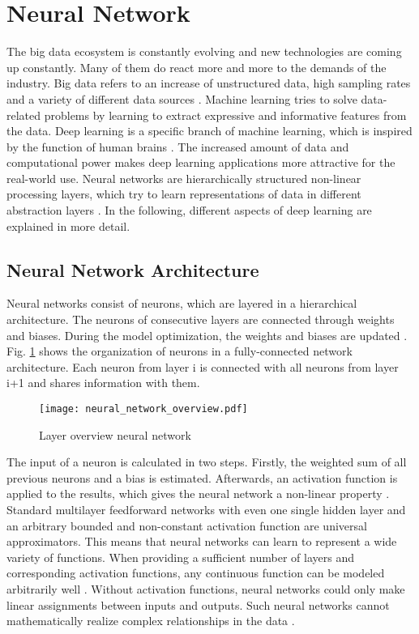\section{Neural Network}
The big data ecosystem is constantly evolving and new technologies are coming up constantly. Many of them do react more and more to the demands of the industry. Big data refers to an increase of unstructured data, high sampling rates and a variety of different data sources \cite{Sagiroglu2013}. Machine learning tries to solve data-related problems by learning to extract expressive and informative features from the data. Deep learning is a specific branch of machine learning, which is inspired by the function of human brains \cite{Calin2020}. The increased amount of data and computational power makes deep learning applications more attractive for the real-world use. Neural networks are hierarchically structured non-linear processing layers, which try to learn representations of data in different abstraction layers \cite{ZHAO2019213}. In the following, different aspects of deep learning are explained in more detail.

\subsection{Neural Network Architecture}
Neural networks consist of neurons, which are layered in a hierarchical architecture. The neurons of consecutive layers are connected through weights and biases. During the model optimization, the weights and biases are updated \cite{ShilohPerl2020}. Fig. \ref{fig:neural_network_overview} shows the organization of neurons in a fully-connected network architecture. Each neuron from layer i is connected with all neurons from layer i+1 and shares information with them.

\begin{figure}[H]
  \centering
  \texttt{[image: neural\_network\_overview.pdf]}
  \caption {Layer overview neural network}
  \label{fig:neural_network_overview}
\end{figure}
The input of a neuron is calculated in two steps. Firstly, the weighted sum of all previous neurons and a bias is estimated. Afterwards, an activation function is applied to the results, which gives the neural network a non-linear property \cite{ShilohPerl2020}. Standard multilayer feedforward networks with even one single hidden layer and an arbitrary bounded and non-constant activation function are universal approximators. This means that neural networks can learn to represent a wide variety of functions. When providing a sufficient number of layers and corresponding activation functions, any continuous function can be modeled arbitrarily well \cite{HORNIK1991}. Without activation functions, neural networks could only make linear assignments between inputs and outputs. Such neural networks cannot mathematically realize complex relationships in the data \cite{Ding2018}.

